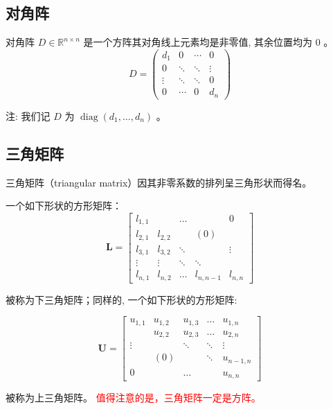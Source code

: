 

\subsection{对角阵}

对角阵 $D \in \mathbb{R}^{n \times n}$ 是一个方阵其对角线上元素均是非零值, 其余位置均为 0 。
$$
D=\left(\begin{array}{cccc}
d_1 & 0 & \cdots & 0 \\
0 & \ddots & \ddots & \vdots \\
\vdots & \ddots & \ddots & 0 \\
0 & \cdots & 0 & d_n
\end{array}\right)
$$

注: 我们记 $D$ 为 $\operatorname{diag}\left(d_1, \ldots, d_n\right)$ 。

\subsection{三角矩阵}

三角矩阵（triangular matrix）因其非零系数的排列呈三角形状而得名。

一个如下形状的方形矩阵：
$$
\mathbf{L}=\left[\begin{array}{ccccc}
l_{1,1} & & \ldots & & 0 \\
l_{2,1} & l_{2,2} & & (0) & \\
l_{3,1} & l_{3,2} & \ddots & & \vdots \\
\vdots & \vdots & \ddots & \ddots & \\
l_{n, 1} & l_{n, 2} & \ldots & l_{n, n-1} & l_{n, n}
\end{array}\right]
$$

被称为下三角矩阵；同样的, 一个如下形状的方形矩阵:

$$
\mathbf{U}=\left[\begin{array}{ccccc}
u_{1,1} & u_{1,2} & u_{1,3} & \ldots & u_{1, n} \\
& u_{2,2} & u_{2,3} & \ldots & u_{2, n} \\
\vdots & & \ddots & \ddots & \vdots \\
& (0) & & \ddots & u_{n-1, n} \\
0 & & \ldots & & u_{n, n}
\end{array}\right]
$$

被称为上三角矩阵。
\textcolor{red}{值得注意的是，三角矩阵一定是方阵。}

